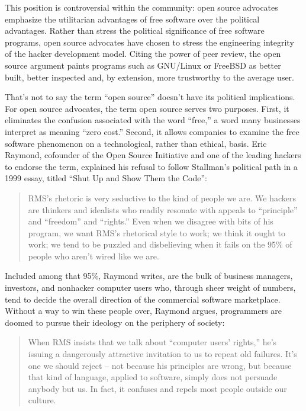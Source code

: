 This position is controversial within the community: open source advocates emphasize the utilitarian advantages of free software over the political advantages. Rather than stress the political significance of free software programs, open source advocates have chosen to stress the engineering integrity of the hacker development model. Citing the power of peer review, the open source argument paints programs such as GNU/Linux or FreeBSD as better built, better inspected and, by extension, more trustworthy to the average user.

That's not to say the term ``open source'' doesn't have its political implications. For open source advocates, the term open source serves two purposes. First, it eliminates the confusion associated with the word ``free,'' a word many businesses interpret as meaning ``zero cost.'' Second, it allows companies to examine the free software phenomenon on a technological, rather than ethical, basis. Eric Raymond, cofounder of the Open Source Initiative and one of the leading hackers to endorse the term, explained his refusal to follow Stallman's political path in a 1999 essay, titled ``Shut Up and Show Them the Code'':

\begin{quote}
RMS's rhetoric is very seductive to the kind of people we are. We hackers are thinkers and idealists who readily resonate with appeals to ``principle'' and ``freedom'' and ``rights.'' Even when we disagree with bits of his program, we want RMS's rhetorical style to work; we think it ought to work; we tend to be puzzled and disbelieving when it fails on the 95\% of people who aren't wired like we are.
\end{quote}

Included among that 95\%, Raymond writes, are the bulk of business managers, investors, and nonhacker computer users who, through sheer weight of numbers, tend to decide the overall direction of the commercial software marketplace. Without a way to win these people over, Raymond argues, programmers are doomed to pursue their ideology on the periphery of society:

\begin{quote}
When RMS insists that we talk about ``computer users' rights,'' he's issuing a dangerously attractive invitation to us to repeat old failures. It's one we should reject -- not because his principles are wrong, but because that kind of language, applied to software, simply does not persuade anybody but us. In fact, it confuses and repels most people outside our culture.
\end{quote}

